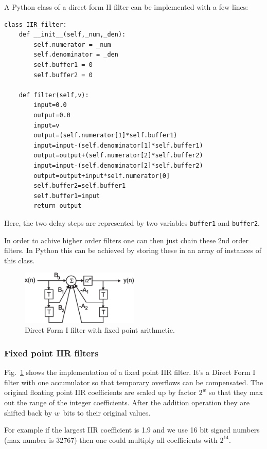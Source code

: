\documentclass[12pt,a4paper]{article}
\begin{document}
A Python class of a direct form II filter can be implemented
with a few lines:
\begin{verbatim}
class IIR_filter:
    def __init__(self,_num,_den):
        self.numerator = _num
        self.denominator = _den
        self.buffer1 = 0
        self.buffer2 = 0

    def filter(self,v):
        input=0.0
        output=0.0
        input=v
        output=(self.numerator[1]*self.buffer1)
        input=input-(self.denominator[1]*self.buffer1)
        output=output+(self.numerator[2]*self.buffer2)
        input=input-(self.denominator[2]*self.buffer2)
        output=output+input*self.numerator[0]
        self.buffer2=self.buffer1
        self.buffer1=input
        return output
\end{verbatim}
Here, the two delay steps are represented by two variables
\texttt{buffer1} and \texttt{buffer2}.

In order to achive higher order filters one can then just
chain these 2nd order filters. In Python this can be achieved
by storing these in an array of instances of this class.

\begin{figure}[!hbt]
\begin{center}
\mbox{\includegraphics[width=0.5\textwidth]{iir_fixed}}
\end{center}
\caption{Direct Form I filter with fixed point arithmetic.
\label{iir_fixed}}
\end{figure}


\subsubsection{Fixed point IIR filters}
Fig.~\ref{iir_fixed} shows the implementation of a fixed point IIR
filter. It's a Direct Form I filter with one accumulator so that
temporary overflows can be compensated. The original floating point
IIR coefficients are scaled up by factor $2^w$ so that they max out
the range of the integer coefficients. After the addition operation
they are shifted back by $w$~bits to their original values.

For example if the largest IIR coefficient is 1.9 and we use 16 bit
signed numbers (max number is 32767) then one could multiply all
coefficients with $2^{14}$.
\end{document}

